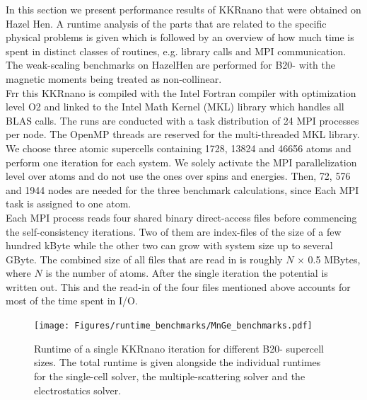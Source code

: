 \documentclass [a4paper, 12pt]{article}
\begin{document}
In this section we present performance results of KKRnano that were obtained on Hazel Hen.
A runtime analysis of the parts that are related to the specific physical problems is given
which is followed by an overview of how much time is spent in distinct
classes of routines, e.g. library calls and MPI communication.\\

The weak-scaling benchmarks on HazelHen are performed for B20- 
with the magnetic moments being treated as
non-collinear.
\\
Frr this KKRnano is compiled with the Intel Fortran compiler
with optimization level O2 and linked to the Intel Math Kernel (MKL) library which handles all BLAS calls.
The runs are conducted with a task distribution of 24 MPI processes per node. The OpenMP threads 
are reserved for the multi-threaded MKL library.
We choose three atomic supercells containing 1728, 13824 and 46656 atoms 
and perform one iteration for each system.
We solely activate the MPI parallelization level over atoms and do not use the ones over spins and energies.
Then, 72, 576 and 1944 nodes
are needed for the three benchmark calculations, since Each MPI task is assigned to one atom. 
\\
Each MPI process reads four shared binary direct-access
files before commencing the self-consistency iterations.
Two of them are index-files of the size of a few hundred kByte while the other two can grow with system size
up to several GByte. The combined size of all files that are 
read in is roughly $N$ $\times$ 0.5 MBytes, where $N$ is the number of atoms. After the single iteration 
the potential is written out. 
This and the read-in of the four files mentioned above accounts for most of the time spent in I/O.

\begin{figure}[h]
\begin{center}
 \texttt{[image: Figures/runtime\_benchmarks/MnGe\_benchmarks.pdf]}
\end{center}
	\caption{Runtime of a single KKRnano iteration for different B20- supercell sizes. 
	The total runtime is given alongside the individual runtimes for the single-cell solver,
	the multiple-scattering solver and the electrostatics solver.
	}
\label{fig:MnGe_6x6x6_benchmark}
\end{figure}
\end{document}

